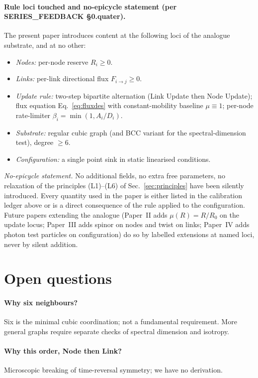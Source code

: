 \documentclass[11pt,a4paper]{article}
\begin{document}
\paragraph{Rule loci touched and no-epicycle statement (per SERIES\_FEEDBACK §0.quater).}
The present paper introduces content at the following loci of
the analogue substrate, and at no other:
\begin{itemize}
\item \emph{Nodes:} per-node reserve $R_i \ge 0$.
\item \emph{Links:} per-link directional flux
$F_{i\to j} \ge 0$.
\item \emph{Update rule:} two-step bipartite alternation
(Link Update then Node Update); flux equation Eq.~\eqref{eq:fluxdes}
with constant-mobility baseline $\mu \equiv 1$;
per-node rate-limiter $\beta_i = \min(1, A_i/D_i)$.
\item \emph{Substrate:} regular cubic graph (and BCC variant
for the spectral-dimension test), degree $\ge 6$.
\item \emph{Configuration:} a single point sink in static
linearised conditions.
\end{itemize}
\noindent
\emph{No-epicycle statement.} No additional fields, no extra
free parameters, no relaxation of the principles
(L1)--(L6) of Sec.~\ref{sec:principles} have been silently
introduced. Every quantity used in the paper is either listed
in the calibration ledger above or is a direct consequence of
the rule applied to the configuration. Future papers
extending the analogue (Paper~II adds $\mu(R) = R/R_0$ on the
update locus; Paper~III adds spinor on nodes and twist on
links; Paper~IV adds photon test particles on configuration)
do so by labelled extensions at named loci, never by silent
addition.

\section{Open questions}
\label{sec:open}

\paragraph{Why six neighbours?} Six is the minimal cubic
coordination; not a fundamental requirement. More general
graphs require separate checks of spectral dimension and
isotropy.

\paragraph{Why this order, Node then Link?} Microscopic
breaking of time-reversal symmetry; we have no derivation.
\end{document}
